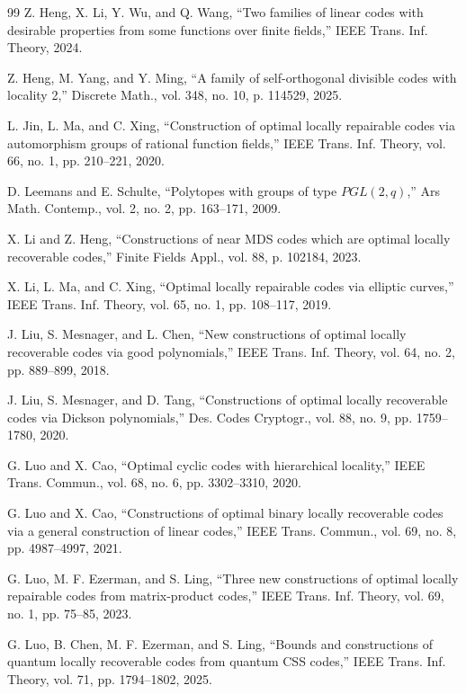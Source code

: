\documentclass[1p,final]{elsarticle}
\newtheorem{open problem}[theorem]{Open Problem}
\begin{document}
\begin{thebibliography}{99}
Z. Heng, X. Li, Y. Wu, and Q. Wang,
``Two families of linear codes with desirable properties from some functions over finite fields,''
IEEE Trans. Inf. Theory, 2024.

Z. Heng, M. Yang, and Y. Ming,
``A family of self-orthogonal divisible codes with locality 2,''
Discrete Math., vol. 348, no. 10, p. 114529, 2025.

L. Jin, L. Ma, and C. Xing,
``Construction of optimal locally repairable codes via automorphism groups of rational function fields,''
IEEE Trans. Inf. Theory, vol. 66, no. 1, pp. 210--221, 2020.

D. Leemans and E. Schulte,
``Polytopes with groups of type $PGL(2,q)$,''
Ars Math. Contemp., vol. 2, no. 2, pp. 163--171, 2009.

X. Li and Z. Heng,
``Constructions of near MDS codes which are optimal locally recoverable codes,''
Finite Fields Appl., vol. 88, p. 102184, 2023.

X. Li, L. Ma, and C. Xing,
``Optimal locally repairable codes via elliptic curves,''
IEEE Trans. Inf. Theory, vol. 65, no. 1, pp. 108--117, 2019.

J. Liu, S. Mesnager, and L. Chen,
``New constructions of optimal locally recoverable codes via good polynomials,''
IEEE Trans. Inf. Theory, vol. 64, no. 2, pp. 889--899, 2018.

J. Liu, S. Mesnager, and D. Tang,
``Constructions of optimal locally recoverable codes via Dickson polynomials,''
Des. Codes Cryptogr., vol. 88, no. 9, pp. 1759--1780, 2020.

G. Luo and X. Cao,
``Optimal cyclic codes with hierarchical locality,''
IEEE Trans. Commun., vol. 68, no. 6, pp. 3302--3310, 2020.

G. Luo and X. Cao,
``Constructions of optimal binary locally recoverable codes via a general construction of linear codes,''
IEEE Trans. Commun., vol. 69, no. 8, pp. 4987--4997, 2021.

G. Luo, M. F. Ezerman, and S. Ling,
``Three new constructions of optimal locally repairable codes from matrix-product codes,''
IEEE Trans. Inf. Theory, vol. 69, no. 1, pp. 75--85, 2023.

G. Luo, B. Chen, M. F. Ezerman, and S. Ling,
``Bounds and constructions of quantum locally recoverable codes from quantum CSS codes,''
IEEE Trans. Inf. Theory, vol. 71, pp. 1794--1802, 2025.


\end{thebibliography}
\end{document}
